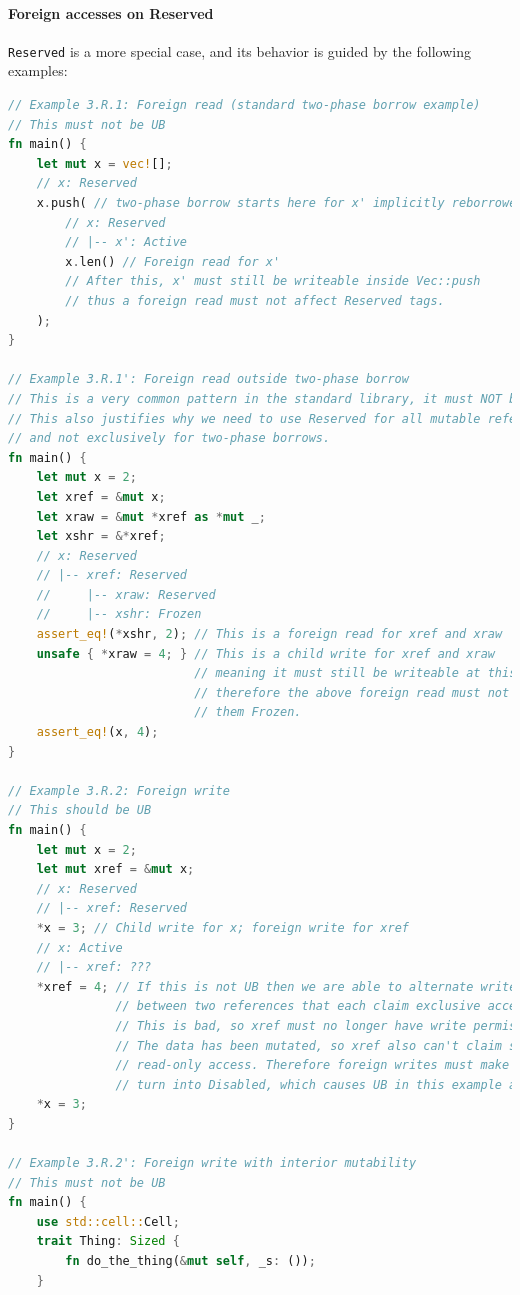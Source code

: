 \documentclass[a4paper,11pt]{article}
\theoremstyle{plain}
\theoremstyle{definition}
\theoremstyle{remark}
\newcommand{\tperm}[1]{\texttt{#1}}
\begin{document}
\paragraph*{Foreign accesses on Reserved}

\tperm{Reserved} is a more special case, and its behavior is guided by the following examples:
\begin{lstlisting}[language=rust]
// Example 3.R.1: Foreign read (standard two-phase borrow example)
// This must not be UB
fn main() {
    let mut x = vec![];
    // x: Reserved
    x.push( // two-phase borrow starts here for x' implicitly reborrowed from x
        // x: Reserved
        // |-- x': Active
        x.len() // Foreign read for x'
        // After this, x' must still be writeable inside Vec::push
        // thus a foreign read must not affect Reserved tags.
    );
}

// Example 3.R.1': Foreign read outside two-phase borrow
// This is a very common pattern in the standard library, it must NOT be UB.
// This also justifies why we need to use Reserved for all mutable references,
// and not exclusively for two-phase borrows.
fn main() {
    let mut x = 2;
    let xref = &mut x;
    let xraw = &mut *xref as *mut _;
    let xshr = &*xref;
    // x: Reserved
    // |-- xref: Reserved
    //     |-- xraw: Reserved
    //     |-- xshr: Frozen
    assert_eq!(*xshr, 2); // This is a foreign read for xref and xraw
    unsafe { *xraw = 4; } // This is a child write for xref and xraw
                          // meaning it must still be writeable at this point,
                          // therefore the above foreign read must not have turned
                          // them Frozen.
    assert_eq!(x, 4);
}

// Example 3.R.2: Foreign write
// This should be UB
fn main() {
    let mut x = 2;
    let mut xref = &mut x;
    // x: Reserved
    // |-- xref: Reserved
    *x = 3; // Child write for x; foreign write for xref
    // x: Active
    // |-- xref: ???
    *xref = 4; // If this is not UB then we are able to alternate writes
               // between two references that each claim exclusive access.
               // This is bad, so xref must no longer have write permissions.
               // The data has been mutated, so xref also can't claim shared
               // read-only access. Therefore foreign writes must make Reserved
               // turn into Disabled, which causes UB in this example as desired.
    *x = 3;
}

// Example 3.R.2': Foreign write with interior mutability
// This must not be UB
fn main() {
    use std::cell::Cell;
    trait Thing: Sized {
        fn do_the_thing(&mut self, _s: ());
    }


\end{lstlisting}
\end{document}
